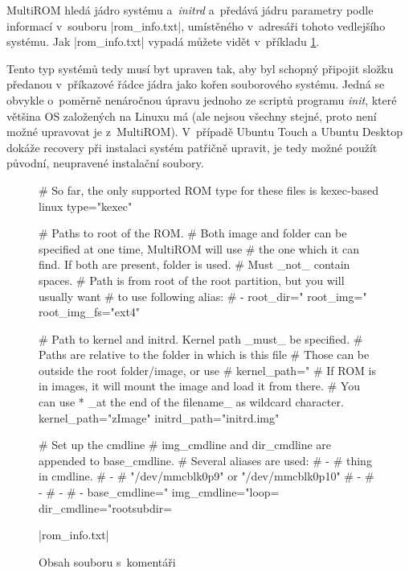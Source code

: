 \documentclass[12pt, a4paper, oneside]{article}
\newcommand{\It}{\textit}  %
\begin{document}
MultiROM hledá jádro systému a~\It{initrd} a~předává jádru parametry podle informací v~souboru |rom_info.txt|, umístěného v~adresáři tohoto vedlejšího systému. Jak |rom_info.txt| vypadá můžete vidět v~příkladu \ref{rom-info}.

Tento typ systémů tedy musí byt upraven tak, aby byl schopný připojit složku předanou v~příkazové řádce jádra jako kořen souborového systému. Jedná se obvykle o~poměrně nenáročnou úpravu jednoho ze scriptů programu \It{init}, které většina OS založených na Linuxu má (ale nejsou všechny stejné, proto není možné upravovat je z~MultiROM). V~případě Ubuntu Touch a Ubuntu Desktop dokáže recovery při instalaci systém patřičně upravit, je tedy možné použít původní, neupravené instalační soubory.

\linespread{1.1}
\begin{figure}[H]
\begin{inicode}
# So far, the only supported ROM type for these files is kexec-based linux
type="kexec"

# Paths to root of the ROM.
# Both image and folder can be specified at one time, MultiROM will use 
# the one which it can find. If both are present, folder is used.
# Must _not_ contain spaces.
# Path is from root of the root partition, but you will usually want
# to use following alias:
# - %
root_dir="%
root_img="%
root_img_fs="ext4"

# Path to kernel and initrd. Kernel path _must_ be specified.
# Paths are relative to the folder in which is this file
# Those can be outside the root folder/image, or use %
# kernel_path="%
# If ROM is in images, it will mount the image and load it from there.
# You can use  * _at the end of the filename_ as wildcard character.
kernel_path="zImage"
initrd_path="initrd.img"

# Set up the cmdline
# img_cmdline and dir_cmdline are appended to base_cmdline.
# Several aliases are used:
#  - %
#         thing in cmdline.
#  - %
#         "/dev/mmcblk0p9" or "/dev/mmcblk0p10"
#  - %
#  - %
#  - %
#  - %
base_cmdline="%
img_cmdline="loop=%
dir_cmdline="rootsubdir=%
\end{inicode}
|rom_info.txt|
\caption{Obsah souboru \protect{} s~komentáři}
\label{rom-info}
\end{figure}
\end{document}
